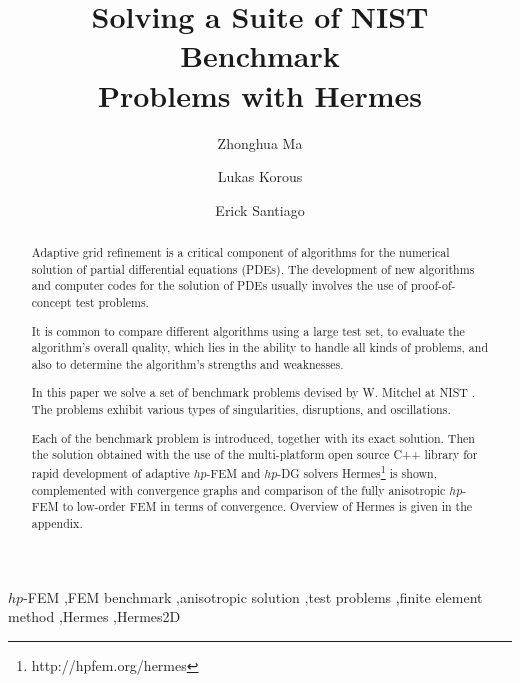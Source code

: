 \documentclass[12pt]{elsarticle}
\begin{document}
\begin{frontmatter}



\title{Solving a Suite of NIST Benchmark \\Problems with Hermes}

\author[label1]{Zhonghua Ma}
\author[label2]{Lukas Korous}
\author[label3]{Erick Santiago}
\address[label1]{China University of Petroleum, Beijing, China}
\address[label2]{Charles University, Prague, Czech Republic}
\address[label3]{University of Nevada, Reno, USA}

\begin{abstract}
Adaptive grid refinement is a critical component of algorithms for the numerical solution of partial differential equations (PDEs).
The development of new algorithms and computer
codes for the solution of PDEs usually involves the use of proof-of-concept test problems.

It is common to compare different algorithms using a large test set, to evaluate the algorithm's overall quality, which lies in the ability to handle all kinds of problems, and also to determine the algorithm's strengths and weaknesses.

In this paper we solve a set of benchmark problems devised by
W. Mitchel at NIST \cite{mitchell-1}.
The problems exhibit various types of singularities, disruptions, and oscillations.

Each of the benchmark problem is introduced, together with its exact solution.
Then the solution obtained with the use of the multi-platform open source
C++ library for rapid development of adaptive $hp$-FEM and $hp$-DG solvers {\sc Hermes}\footnote{http://hpfem.org/hermes} is shown,
complemented with convergence graphs and comparison of the fully anisotropic
$hp$-FEM to low-order FEM in terms of convergence.
Overview of Hermes is given in the appendix.
\end{abstract}

\begin{keyword}
$hp$-FEM \sep FEM benchmark \sep anisotropic solution \sep test problems \sep finite element method \sep Hermes \sep Hermes2D
\end{keyword}

\end{frontmatter}
\end{document}
